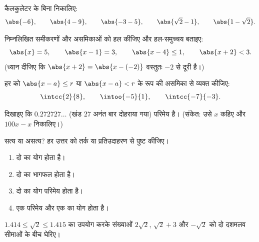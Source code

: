 \begin{exercise}[$\star$]\label{exo:g10:numbers:4}
कैलकुलेटर के बिना निकालिए:
\[
\abs{-6}, \qquad \abs{4 - 9}, \qquad \abs{-3 - 5}, \qquad
\abs{\sqrt 2 - 1}, \qquad \abs{1 - \sqrt 2}.
\]
\end{exercise}

\begin{exercise}[$\star$]\label{exo:g10:numbers:5}
निम्नलिखित समीकरणों और असमिकाओं को हल कीजिए और हल-समुच्चय बताइए:
\[
\abs{x} = 5, \qquad \abs{x - 1} = 3, \qquad \abs{x - 4} \leq 1, \qquad
\abs{x + 2} < 3 .
\]
(ध्यान दीजिए कि $\abs{x+2} = \abs{x - (-2)}$ वस्तुतः $-2$ से दूरी है।)
\end{exercise}

\begin{exercise}[$\star\star$]\label{exo:g10:numbers:6}
हर  को $\abs{x - a} \leq r$ या $\abs{x - a} < r$ के रूप की असमिका से व्यक्त कीजिए:
\[
\intcc{2}{8}, \qquad \intoo{-5}{1}, \qquad \intcc{-7}{-3}.
\]
\end{exercise}

\begin{exercise}[$\star\star$]\label{exo:g10:numbers:7}
दिखाइए कि $0.272727\dots$ (खंड $27$ अनंत बार दोहराया गया) परिमेय है।
(संकेत: उसे $x$ कहिए और $100x - x$ निकालिए।)
\end{exercise}

\begin{exercise}[$\star\star$]\label{exo:g10:numbers:8}
सत्य या असत्य? हर उत्तर को तर्क या प्रतिउदाहरण से पुष्ट कीजिए।
\begin{enumerate}
  \item दो  का योग  होता है।
  \item दो  का भागफल  होता है।
  \item दो  का योग परिमेय होता है।
  \item एक परिमेय और एक  का योग  होता है।
\end{enumerate}
\end{exercise}

\begin{exercise}[$\star\star$]\label{exo:g10:numbers:9}
$1.414 \leq \sqrt 2 \leq 1.415$ का उपयोग करके संख्याओं $2\sqrt2$, $\sqrt2 + 3$ और $-\sqrt2$ को दो दशमलव सीमाओं
के बीच घेरिए।
\end{exercise}

